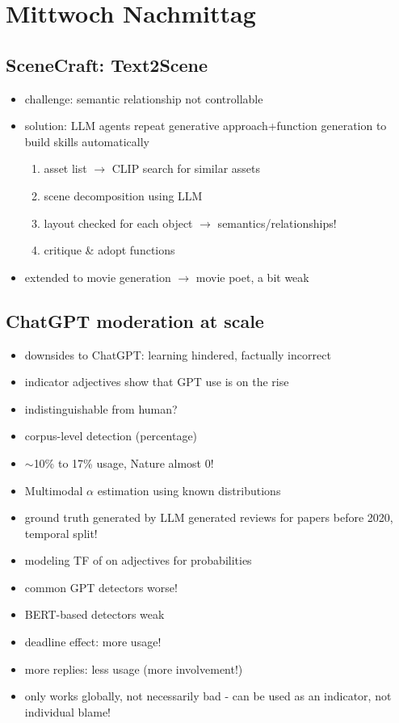 \documentclass[a4paper]{article}
\begin{document}
\section*{Mittwoch Nachmittag}
\subsection*{SceneCraft: Text2Scene}
\begin{itemize}
    \item challenge: semantic relationship not controllable
    \item solution: LLM agents repeat generative approach+function generation to build skills automatically
          \begin{enumerate}
              \item asset list $\rightarrow$ CLIP search for similar assets
              \item scene decomposition using LLM
              \item layout checked for each object $\rightarrow$ semantics/relationships!
              \item critique \& adopt functions
          \end{enumerate}
    \item extended to movie generation $\rightarrow$ movie poet, a bit weak
\end{itemize}
\subsection*{ChatGPT moderation at scale}
\begin{itemize}
    \item downsides to ChatGPT: learning hindered, factually incorrect
    \item indicator adjectives show that GPT use is on the rise
    \item indistinguishable from human?
    \item corpus-level detection (percentage)
    \item $\sim$10\% to 17\% usage, Nature almost 0!
    \item Multimodal $\alpha$ estimation using known distributions
    \item ground truth generated by LLM generated reviews for papers before 2020, temporal split!
    \item modeling TF of on adjectives for probabilities
    \item common GPT detectors worse!
    \item BERT-based detectors weak
    \item deadline effect: more usage!
    \item more replies: less usage (more involvement!)
    \item only works globally, not necessarily bad - can be used as an indicator, not individual blame!
\end{itemize}
\end{document}
